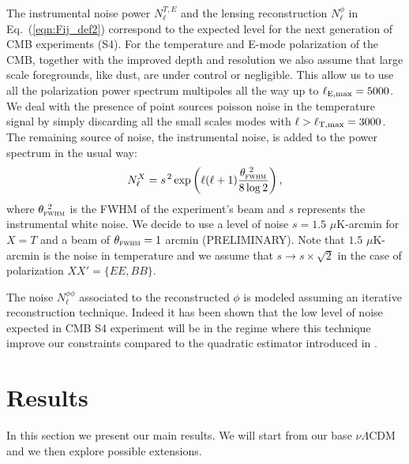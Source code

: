 \documentclass[aps,prd,reprint,superscriptaddress]{revtex4-1}
\newcommand\refeq[1]{Eq.~(\ref{eqn:#1})}
\begin{document}
The instrumental noise power $N_{\ell}^{T,E}$ and the lensing reconstruction $N_{\ell}^{\phi}$ in \refeq{Fij_def2} correspond to the expected level for the next generation of CMB experiments (S4).
For the temperature and E-mode polarization of the CMB, together with the improved depth and resolution we also assume that large scale foregrounds, like dust, are under control or negligible. This allow us to use all the polarization power spectrum multipoles all the way up to $\ell_{\rm E,max}=5000$. We deal with the presence of point sources poisson noise in the temperature signal by simply discarding all the small scales modes with $\ell>\ell_{\rm T,max}=3000$.
The remaining source of noise, the instrumental noise, is added to the power spectrum in the usual way:
 \begin{equation}
 	\centering
		N^{X}_\ell = s^{\, 2} \exp \left(\ell(\ell+1) \frac{\theta^{\ 2}_{\textsc{fwhm}}}{8\log2}\right),
	\label{eq:beamnoise}
\end{equation}
where $\theta^{\ 2}_{\textsc{fwhm}}$ is the FWHM of the experiment's beam and $s$ represents the instrumental white noise.
We decide to use a level of noise $s = 1.5$ $\mu$K-arcmin for $X=T$ and a beam of $\theta_{\textsc{fwhm}}=1$ arcmin (PRELIMINARY).
Note that $1.5$ $\mu$K-arcmin is the noise in temperature and we assume that $s \rightarrow s\times \sqrt{2}$ in the case of polarization $ XX' = \{ EE, BB \}$.


The noise $N_\ell^{\phi\phi}$ associated to the reconstructed $\phi$ is modeled assuming an iterative reconstruction technique. Indeed it has been shown \cite{seljak:2004} that the low level of noise expected in CMB S4 experiment will be in the regime  where this technique improve our constraints compared to the quadratic estimator introduced in \cite{okamoto:2003,hu:2002}.


\section{Results \label{sec:results}}
In this section we present our main results. We will start from our base $\nu \Lambda$CDM and we then explore possible extensions.
\end{document}
